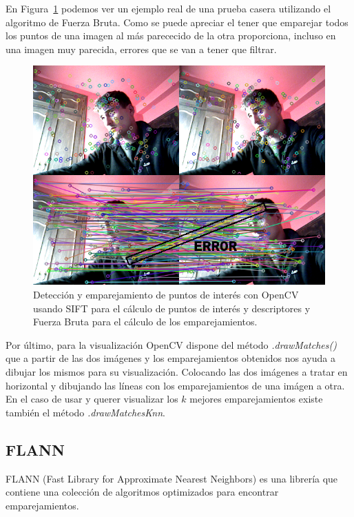En Figura~\ref{fig:SiftDetector} podemos ver un ejemplo real de una prueba casera utilizando el algoritmo de Fuerza Bruta. Como se puede apreciar el tener que emparejar todos los puntos de una imagen al más parececido de la otra proporciona, incluso en una imagen muy parecida, errores que se van a tener que filtrar.

\begin{figure}[th]
\centering
\includegraphics[scale=0.8]{Figures/sift-detector.png}
\decoRule
\caption[sift-detector]{Detección y emparejamiento de puntos de interés con OpenCV usando SIFT para el cálculo de puntos de interés y descriptores y Fuerza Bruta para el cálculo de los emparejamientos.}
\label{fig:SiftDetector}
\end{figure}



Por último, para la visualización OpenCV dispone del método \textit{.drawMatches()} que a partir de las dos imágenes y los emparejamientos obtenidos nos ayuda a dibujar los mismos para su visualización. Colocando las dos imágenes a tratar en horizontal y dibujando las líneas con los emparejamientos de una imágen a otra. En el caso de usar y querer visualizar los $k$ mejores emparejamientos existe también el método \textit{.drawMatchesKnn}.


\subsection{FLANN}

FLANN (Fast Library for Approximate Nearest Neighbors) es una librería que contiene una colección de algoritmos optimizados para encontrar emparejamientos.

